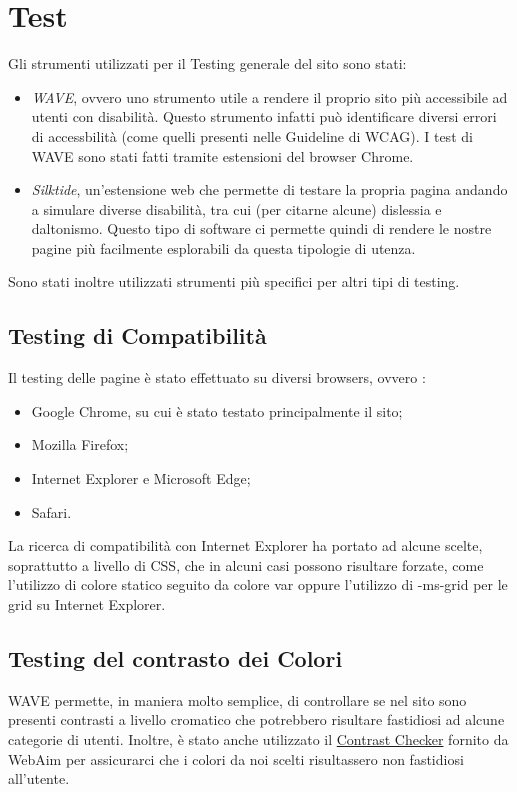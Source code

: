 \section{Test}

  Gli strumenti utilizzati per il Testing generale del sito sono stati:
  \begin{itemize}
    \item \textit{WAVE}, ovvero uno strumento utile a rendere il proprio sito più accessibile ad utenti con disabilità. Questo strumento infatti può identificare diversi errori di accessbilità (come quelli presenti nelle Guideline di WCAG). I test di WAVE sono stati fatti tramite estensioni del browser Chrome.
    \item \textit{Silktide}, un'estensione web che permette di testare la propria pagina andando a simulare diverse disabilità, tra cui (per citarne alcune) dislessia e daltonismo. Questo tipo di software ci permette quindi di rendere le nostre pagine più facilmente esplorabili da questa tipologie di utenza.
  \end{itemize}
  Sono stati inoltre utilizzati strumenti più specifici per altri tipi di testing.
	
  \subsection{Testing di Compatibilità}
    Il testing delle pagine è stato effettuato su diversi browsers, ovvero :
    \begin{itemize}
      \item Google Chrome, su cui è stato testato principalmente il sito;
      \item Mozilla Firefox;
      \item Internet Explorer e Microsoft Edge;
      \item Safari.
    \end{itemize}
    La ricerca di compatibilità con Internet Explorer ha portato ad alcune scelte, soprattutto a livello di CSS, che in alcuni casi possono risultare forzate, come l'utilizzo di colore statico seguito da colore var oppure l'utilizzo di -ms-grid per le grid su Internet Explorer.

  \subsection{Testing del contrasto dei Colori} 
    WAVE permette, in maniera molto semplice, di controllare se nel sito sono presenti contrasti a livello cromatico che potrebbero risultare fastidiosi ad alcune categorie di utenti.
    Inoltre, è stato anche utilizzato il \href{https://webaim.org/resources/contrastchecker/}{Contrast Checker} fornito da WebAim per assicurarci che i colori da noi scelti risultassero non fastidiosi all'utente.

